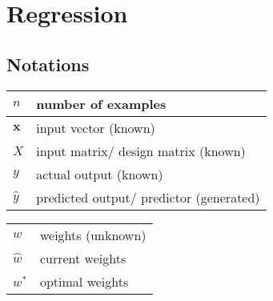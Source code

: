 \chapter{Regression}

\section*{Notations \cite{dnn-1}}

\begin{table}[H]
    \begin{minipage}[t]{0.49\linewidth}        
        \begin{customTableWrapper}{1.3}
        \begin{table}[H]
            \begin{tabular}{|l l|}
                \hline
        
                $n$ & number of examples \\
        
                \hline
        
                $\mathbf{x}$ & input vector (known) \\
                $X$ & input matrix/ design matrix (known) \\

                \hline
        
                $y$ & actual output (known) \\
                $\hat{y}$ & predicted output/ predictor (generated) \\
        
                \hline
        
            \end{tabular}
        \end{table}
        \end{customTableWrapper}
    \end{minipage}
    \hfill
    \begin{minipage}[t]{0.49\linewidth}
        \begin{customTableWrapper}{1.3}
        \begin{table}[H]
            \begin{tabular}{|l l|}
                \hline
        
                $w$ & weights (unknown) \\
                $\hat{w}$ & current weights \\
                $w^\ast$ & optimal weights \\
        

\end{tabular}
\end{table}
\end{customTableWrapper}
\end{minipage}
\end{table}
